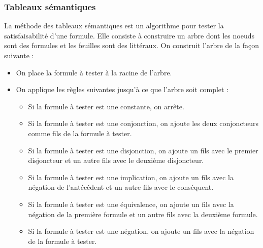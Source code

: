 \documentclass{rapportULB}
\begin{document}
\subsubsection{Tableaux sémantiques}
La méthode des tableaux sémantiques est un algorithme pour tester la satisfaisabilité d'une formule. Elle consiste à construire un arbre dont les noeuds sont des formules et les feuilles sont des littéraux. On construit l'arbre de la façon suivante :
\begin{itemize}[label=$\bullet$]
  \item On place la formule à tester à la racine de l'arbre.
  \item On applique les règles suivantes jusqu'à ce que l'arbre soit complet :
  \begin{itemize}[label=$\circ$]
    \item Si la formule à tester est une constante, on arrête.
    \item Si la formule à tester est une conjonction, on ajoute les deux conjoncteurs comme fils de la formule à tester.
    \item Si la formule à tester est une disjonction, on ajoute un fils avec le premier disjoncteur et un autre fils avec le deuxième disjoncteur.
    \item Si la formule à tester est une implication, on ajoute un fils avec la négation de l'antécédent et un autre fils avec le conséquent.
    \item Si la formule à tester est une équivalence, on ajoute un fils avec la négation de la première formule et un autre fils avec la deuxième formule.
    \item Si la formule à tester est une négation, on ajoute un fils avec la négation de la formule à tester.
  \end{itemize}
\end{itemize}
\end{document}

